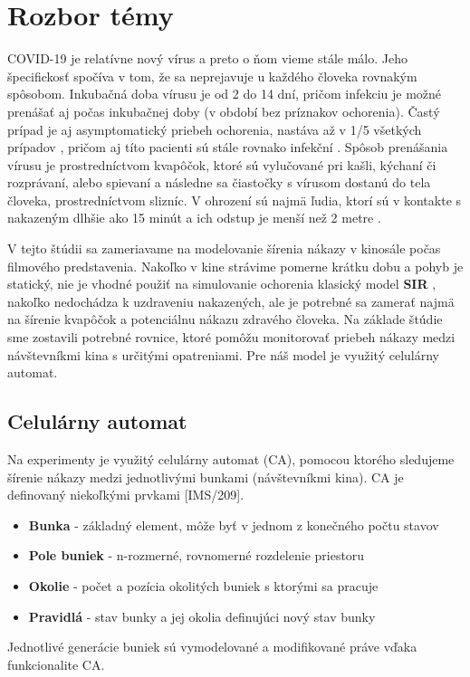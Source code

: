 \documentclass[a4paper, 11pt]{article}
\begin{document}
    \section{Rozbor témy}
    \par COVID-19 je relatívne nový vírus a preto o ňom vieme stále málo. Jeho špecifickosť spočíva v tom, že sa neprejavuje u každého človeka rovnakým spôsobom. Inkubačná doba vírusu je od 2 do 14 dní, pričom infekciu je možné prenášať aj počas inkubačnej doby (v období bez príznakov ochorenia). Častý prípad je aj asymptomatický priebeh ochorenia, nastáva až v 1/5 všetkých prípadov \cite{asymptomatic}, pričom aj títo pacienti sú stále rovnako infekční \cite{asymptomaticinfectious}. Spôsob prenášania vírusu je prostredníctvom kvapôčok, ktoré sú vylučované pri kašli, kýchaní či rozprávaní, alebo spievaní a následne sa čiastočky s vírusom dostanú do tela človeka, prostredníctvom slizníc. V ohrození sú najmä ľudia, ktorí sú v kontakte s nakazeným dlhšie ako 15 minút a ich odstup je menší než 2 metre \cite{wikipedia}. 
    
    \par V tejto štúdii sa zameriavame na modelovanie šírenia nákazy v kinosále počas filmového predstavenia. Nakoľko v kine strávime pomerne krátku dobu a pohyb je statický, nie je vhodné použiť na simulovanie ochorenia klasický model \textbf{SIR} \cite{basicmodels}, nakoľko nedochádza k uzdraveniu nakazených, ale je potrebné sa zamerať najmä na šírenie kvapôčok a potenciálnu nákazu zdravého človeka. Na základe štúdie \cite{joslelieveldfrankhelleiset.al.2020} sme zostavili potrebné rovnice, ktoré pomôžu monitorovať priebeh nákazy medzi návštevníkmi kina s určitými opatreniami. Pre náš model je využitý celulárny automat.
    

        \subsection{Celulárny automat}
        Na experimenty je využitý celulárny automat (CA), pomocou ktorého sledujeme šírenie nákazy medzi jednotlivými bunkami (návštevníkmi kina). CA je definovaný niekoľkými prvkami [IMS/209].   
        \begin{itemize}
            \item \textbf{Bunka} - základný element, môže byť v jednom z konečného počtu stavov
            \item \textbf{Pole buniek} - n-rozmerné, rovnomerné rozdelenie priestoru
            \item \textbf{Okolie} - počet a pozícia okolitých buniek s ktorými sa pracuje
            \item \textbf{Pravidlá} - stav bunky a jej okolia definujúci nový stav bunky
        \end{itemize}
        Jednotlivé generácie buniek sú vymodelované a modifikované práve vďaka funkcionalite CA. 
    
\end{document}
